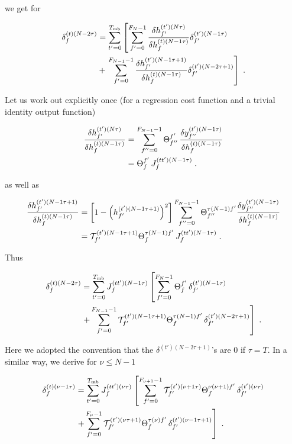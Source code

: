 \begin{subappendices}
we get for

\begin{align}
\delta^{(t)(N-2\tau)}_f&= \sum_{t'=0}^{T_{{\rm mb}}}\left[\sum_{f'=0}^{F_{N}-1}
%
\frac{\delta h^{(t')(N\tau)}_{f'}}{\delta h^{(t)(N-1\tau)}_f }\delta^{(t')(N-1\tau)}_{f'}\right.\notag\\
%
&+\left.\sum_{f'=0}^{F_{N-1}-1}\frac{\delta h^{(t')(N-1\tau+1)}_{f'}}{\delta h^{(t)(N-1\tau)}_f }\delta^{(t')(N-2\tau+1)}_{f'}\right]\;.
\end{align}

Let us work out explicitly once (for a regression cost function and a trivial identity output function)

\begin{align}
\frac{\delta h^{(t')(N\tau)}_{f'}}{\delta h^{(t)(N-1\tau)}_f }&=\sum_{f''=0}^{F_{N-1}-1}\Theta^{f'}_{f''}\,
%
\frac{\delta y^{(t')(N-1\tau)}_{f''}}{\delta h^{(t)(N-1\tau)}_f } \notag\\
%
&=\Theta^{f'}_{f}\,J_f^{(tt')(N-1\tau)}\;.
\end{align}

as well as

\begin{align}
\frac{\delta h^{(t')(N-1\tau+1)}_{f'}}{\delta h^{(t)(N-1\tau)}_f }&=
%
\left[1-\left(h^{(t')(N-1\tau+1)}_{f'}\right)^2\right]\sum_{f''=0}^{F_{{N-1}}-1}\Theta^{\tau(N-1)f'}_{f''}
%
\frac{\delta y^{(t')(N-1\tau)}_{f''}}{\delta h^{(t)(N-1\tau)}_f }\notag\\
%
&=\mathcal{T}^{(t')(N-1\tau+1)}_{f'}\Theta^{\tau(N-1)f'}_{f}\,J_f^{(tt')(N-1\tau)}\;.
\end{align}

Thus

\begin{align}
\delta^{(t)(N-2\tau)}_f&= \sum_{t'=0}^{T_{{\rm mb}}}J_f^{(tt')(N-1\tau)}\left[\sum_{f'=0}^{F_{N}-1}
%
\Theta^{f'}_{f}\,\delta^{(t')(N-1\tau)}_{f'}\right.\notag\\
%
&\left.+\sum_{f'=0}^{F_{N-1}-1}\mathcal{T}^{(t')(N-1\tau+1)}_{f'}\Theta^{\tau(N-1)f'}_{f}\,\delta^{(t')(N-2\tau+1)}_{f'}\right]\;.
\end{align}

Here we adopted the convention that the $\delta^{(t')(N-2\tau+1)}$'s are $0$ if $\tau=T$. In a similar way, we derive for $\nu\leq N-1$

\begin{align}
\delta^{(t)(\nu-1\tau)}_f&= \sum_{t'=0}^{T_{{\rm mb}}}J^{(tt')(\nu\tau)}_f\left[\sum_{f'=0}^{F_{\nu+1}-1}
%
\mathcal{T}^{(t')(\nu+1\tau)}_{f'}\Theta^{\nu(\nu+1)f'}_{f}\,\delta^{(t')(\nu\tau)}_{f'}\right.\notag\\
%
&\left.+\sum_{f'=0}^{F_{\nu}-1}\mathcal{T}^{(t')(\nu\tau+1)}_{f'}\Theta^{\tau(\nu)f'}_{f}\,\delta^{(t')(\nu-1\tau+1)}_{f'}\right]\;.
\end{align}


\end{subappendices}
